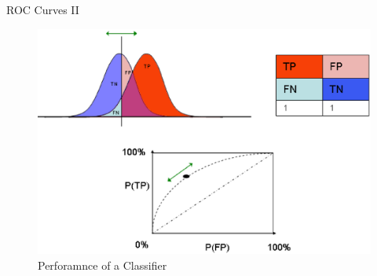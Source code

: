 \begin{frame}{ROC Curves II}
	\begin{figure}
		\centering
		\includegraphics[height=\textwidth]{images/ROC_Class2Curve.eps}
		\caption{Perforamnce of a Classifier}
		\label{fig:ROCClass2Curve}
	\end{figure}
\end{frame}
